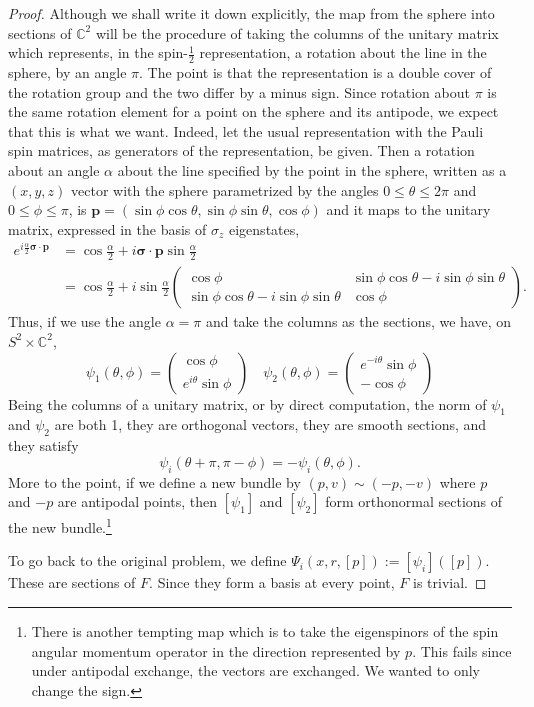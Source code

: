 \documentclass[11pt]{article}
\theoremstyle{remark}
\begin{document}
\begin{proof}
Although we shall write it down explicitly, the map from the sphere
into sections of $\ensuremath{\mathbb{C}}^2$ will be the procedure of taking the
columns of the unitary matrix which represents, in the
spin-$\frac{1}{2}$ representation, a rotation about the line in the
sphere, by an angle $\pi$. The point is that the representation is a
double cover of the rotation group and the two differ by a minus
sign. Since rotation about $\pi$ is the same rotation element for a
point on the sphere and its antipode, we expect that this is what we
want. Indeed, let the usual representation with the Pauli spin
matrices, as generators of the representation, be given. 
Then a rotation about an angle $\alpha$ about the line specified by
the point in the sphere, written as a $(x, y, z)$ vector with the
sphere  parametrized 
 by the angles $0 \leq \theta \leq 2\pi$ and $0
\leq \phi \leq \pi$, is
$\boldsymbol{p}= (\sin\phi\cos\theta, \sin\phi\sin\theta, \cos\phi)$ 
and it  maps to the unitary matrix, expressed in the basis of $\sigma_{z}$
eigenstates,  
\[ 
\begin{split}
e^{i \frac{\alpha}{2} \boldsymbol{\sigma} \cdot \boldsymbol{p}} 
&= \cos\frac{\alpha}{2} + 
i\boldsymbol{\sigma} \cdot \boldsymbol{p}\sin\frac{\alpha}{2} \\
& =
\cos\frac{\alpha}{2} + i\sin\frac{\alpha}{2} \begin{pmatrix}
\cos\phi & \sin\phi\cos\theta - i\sin\phi\sin\theta \\ 
\sin\phi\cos\theta - i\sin\phi\sin\theta &\cos\phi
\end{pmatrix}.
\end{split} 
\]
Thus, if we use the angle $\alpha = \pi$ and take the columns as the
sections, we have, on $S^2\times \ensuremath{\mathbb{C}}^2$, 
\[
\ensuremath{\psi}_1 (\theta, \phi)= 
\begin{pmatrix}
\cos\phi\\
e^{i\theta}\sin\phi
\end{pmatrix}
\quad
\ensuremath{\psi}_2 (\theta, \phi) = 
\begin{pmatrix} 
e^{-i\theta} \sin\phi\\
-\cos\phi
\end{pmatrix}
\]  
Being the columns of a unitary matrix, or by direct computation, 
the norm of $\ensuremath{\psi}_1$ and $\ensuremath{\psi}_2$ are both 1,
they are orthogonal vectors, they are smooth 
sections,
and they satisfy 
\[
\ensuremath{\psi}_i(\theta + \pi, \pi - \phi) = - \ensuremath{\psi}_i(\theta, \phi).
\] 
More to the point, if we define a new bundle by 
$(p, v) \sim (-p, -v)$ where $p$ and $-p$ are antipodal points, 
then $[\ensuremath{\psi}_1]$ and $[\ensuremath{\psi}_2]$ form
orthonormal sections of the new bundle.\footnote{There is another
tempting map which is to take the eigenspinors of the spin angular
momentum operator in the direction represented by $p$. This fails
since under antipodal exchange, the vectors are exchanged. We wanted
to only change the sign.} 

To go back to the original problem, we define $\Psi_i (x, r, [p]) 
\ensuremath{:=} [\ensuremath{\psi}_i]([p])$. These are sections of  $F$. Since
they form a basis at every point, $F$ is trivial. 
\end{proof}
\end{document}
